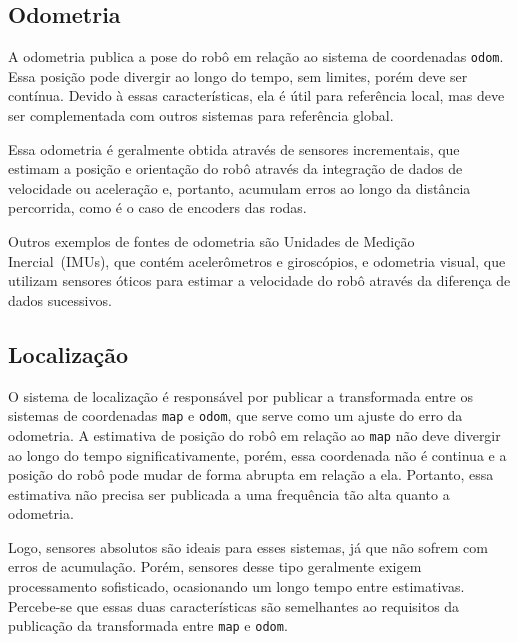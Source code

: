 \documentclass[repeatfields,xlists,xpacks,oneside,yearsonly]{ufrgscca}
\begin{document}

\subsection{Odometria}

A odometria publica a pose do robô em relação ao sistema de
coordenadas \texttt{odom}. Essa posição pode divergir ao longo do
tempo, sem limites, porém deve ser contínua. Devido à essas
características, ela é útil para referência local, mas deve ser
complementada com outros sistemas para referência global.

Essa odometria é geralmente obtida através de sensores incrementais,
que estimam a posição e orientação do robô através da integração de
dados de velocidade ou aceleração e, portanto, acumulam erros ao
longo da distância percorrida, como é o caso de encoders das rodas.

Outros exemplos de fontes de odometria são Unidades de Medição
Inercial~(IMUs), que contém acelerômetros e giroscópios, e odometria
visual, que utilizam sensores óticos para estimar a velocidade do
robô através da diferença de dados sucessivos.


\subsection{Localização}

O sistema de localização é responsável por publicar a transformada
entre os sistemas de coordenadas \texttt{map} e \texttt{odom}, que
serve como um ajuste do erro da odometria. A estimativa de posição do
robô em relação ao \texttt{map} não deve divergir ao longo do tempo
significativamente, porém, essa coordenada não é continua e a posição
do robô pode mudar de forma abrupta em relação a ela. Portanto, essa
estimativa não precisa ser publicada a uma frequência tão alta quanto
a odometria.

Logo, sensores absolutos são ideais para esses sistemas, já que não
sofrem com erros de acumulação. Porém, sensores desse tipo geralmente
exigem processamento sofisticado, ocasionando um longo tempo entre
estimativas. Percebe-se que essas duas características são
semelhantes ao requisitos da publicação da transformada entre
\texttt{map} e \texttt{odom}.
\end{document}
